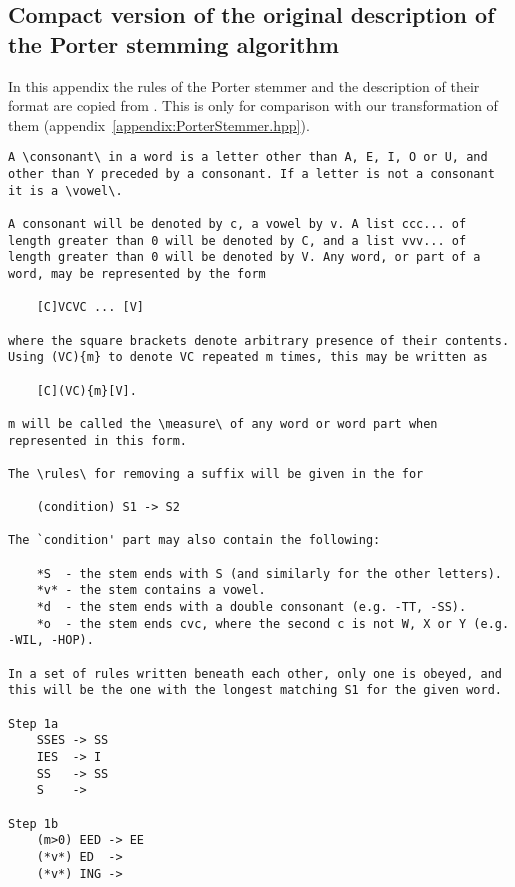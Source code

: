 \documentclass{article}
\begin{document}
	\begin{appendices}
		\newpage
		\section{Compact version of the original description of the Porter stemming algorithm}
		\label{appendix:porter-stemmer:original_rules}
		In this appendix the rules of the Porter stemmer and the description of their format are copied from \cite{Porter-stemmer}.
		This is only for comparison with our transformation of them (appendix~\ref{appendix:PorterStemmer.hpp}).
		\begin{verbatim}
A \consonant\ in a word is a letter other than A, E, I, O or U, and other than Y preceded by a consonant. If a letter is not a consonant it is a \vowel\.

A consonant will be denoted by c, a vowel by v. A list ccc... of length greater than 0 will be denoted by C, and a list vvv... of length greater than 0 will be denoted by V. Any word, or part of a word, may be represented by the form

	[C]VCVC ... [V]

where the square brackets denote arbitrary presence of their contents. Using (VC){m} to denote VC repeated m times, this may be written as

	[C](VC){m}[V].

m will be called the \measure\ of any word or word part when represented in this form.

The \rules\ for removing a suffix will be given in the for

	(condition) S1 -> S2

The `condition' part may also contain the following:

	*S  - the stem ends with S (and similarly for the other letters).
	*v* - the stem contains a vowel.
	*d  - the stem ends with a double consonant (e.g. -TT, -SS).
	*o  - the stem ends cvc, where the second c is not W, X or Y (e.g. -WIL, -HOP).
	
In a set of rules written beneath each other, only one is obeyed, and this will be the one with the longest matching S1 for the given word.

Step 1a
	SSES -> SS                         
	IES  -> I                          
	SS   -> SS                         
	S    ->                            

Step 1b
	(m>0) EED -> EE                    
	(*v*) ED  ->                       
	(*v*) ING ->                       


\end{verbatim}
\end{appendices}
\end{document}
